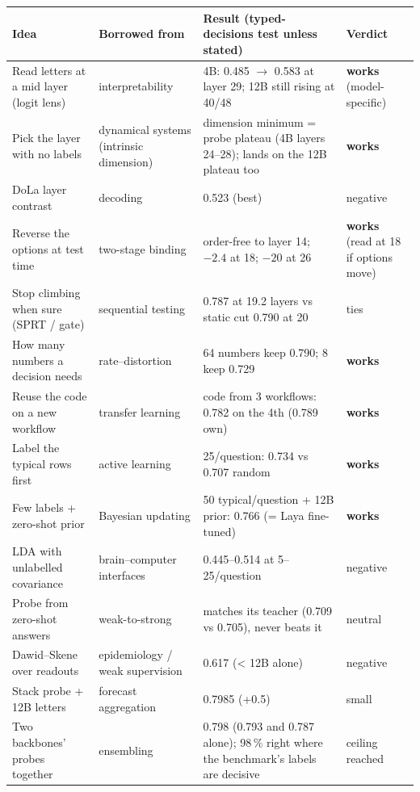 \documentclass[11pt,a4paper]{article}
\renewcommand{\arraystretch}{1.18}
\begin{document}
\begin{table}[p]
\centering\footnotesize\renewcommand{\arraystretch}{1.05}
\begin{tabularx}{\textwidth}{L{42mm} L{30mm} X L{20mm}}
\toprule
Idea & Borrowed from & Result (typed-decisions test unless stated) & Verdict \\
\midrule
Read letters at a mid layer (logit lens) & interpretability \cite{halawi} & 4B: 0.485 $\to$ 0.583 at layer 29; 12B still rising at 40/48 & \textbf{works} (model-specific) \\
Pick the layer with no labels & dynamical systems (intrinsic dimension) \cite{twonn,cheng} & dimension minimum = probe plateau (4B layers 24--28); lands on the 12B plateau too & \textbf{works} \\
DoLa layer contrast & decoding \cite{dola} & 0.523 (best) & negative \\
Reverse the options at test time & two-stage binding \cite{twostage} & order-free to layer 14; $-2.4$ at 18; $-20$ at 26 & \textbf{works} (read at 18 if options move) \\
Stop climbing when sure (SPRT / gate) & sequential testing \cite{schwartz,jazbec} & 0.787 at 19.2 layers vs static cut 0.790 at 20 & ties \\
How many numbers a decision needs & rate--distortion \cite{hernandez} & 64 numbers keep 0.790; 8 keep 0.729 & \textbf{works} \\
Reuse the code on a new workflow & transfer learning & code from 3 workflows: 0.782 on the 4th (0.789 own) & \textbf{works} \\
Label the typical rows first & active learning \cite{typiclust} & 25/question: 0.734 vs 0.707 random & \textbf{works} \\
Few labels + zero-shot prior & Bayesian updating & 50 typical/question + 12B prior: 0.766 (= Laya fine-tuned) & \textbf{works} \\
LDA with unlabelled covariance & brain--computer interfaces & 0.445--0.514 at 5--25/question & negative \\
Probe from zero-shot answers & weak-to-strong \cite{w2s} & matches its teacher (0.709 vs 0.705), never beats it & neutral \\
Dawid--Skene over readouts & epidemiology / weak supervision & 0.617 (< 12B alone) & negative \\
Stack probe + 12B letters & forecast aggregation & 0.7985 (+0.5) & small \\
Two backbones' probes together & ensembling & 0.798 (0.793 and 0.787 alone); 98\,\% right where the benchmark's labels are decisive & ceiling reached \\

\end{tabularx}
\end{table}
\end{document}

